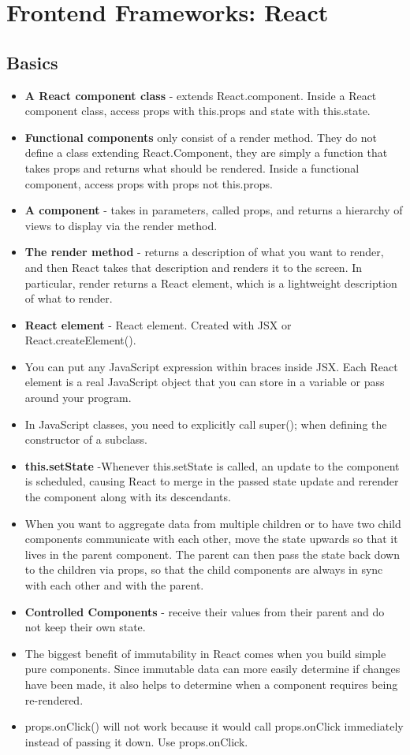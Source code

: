 \twocolumn
\chapter{Frontend Frameworks: React}
\section{Basics}
\begin{itemize}
\item \textbf{A React component class} - extends React.component. Inside a React component class, access props with {this.props} and state with {this.state}.
\item \textbf{Functional components} only consist of a render method. They do not define a class extending React.Component, they are simply a function that takes props and returns what should be rendered. Inside a functional component, access props with {props} not {this.props}.
\item \textbf{A component} - takes in parameters, called props, and returns a hierarchy of views to display via the render method.
\item \textbf{The render method} - returns a description of what you want to render, and then React takes that description and renders it to the screen. In particular, render returns a React element, which is a lightweight description of what to render.
\item \textbf{React element} - React element. Created with JSX or React.createElement().
\item You can put any JavaScript expression within braces inside JSX. Each React element is a real JavaScript object that you can store in a variable or pass around your program.
\item In JavaScript classes, you need to explicitly call super(); when defining the constructor of a subclass.
\item \textbf{this.setState} -Whenever this.setState is called, an update to the component is scheduled, causing React to merge in the passed state update and rerender the component along with its descendants.
\item When you want to aggregate data from multiple children or to have two child components communicate with each other, move the state upwards so that it lives in the parent component. The parent can then pass the state back down to the children via props, so that the child components are always in sync with each other and with the parent.
\item \textbf{Controlled Components} - receive their values from their parent and do not keep their own state.
\item The biggest benefit of immutability in React comes when you build simple pure components. Since immutable data can more easily determine if changes have been made, it also helps to determine when a component requires being re-rendered.
\item {props.onClick()} will not work because it would call props.onClick immediately instead of passing it down. Use {props.onClick}.
\end{itemize}

